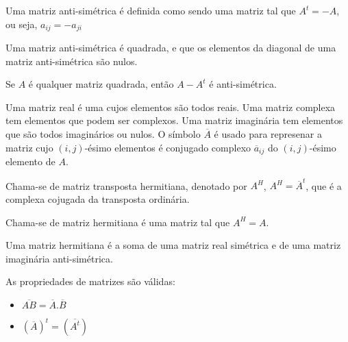 \documentclass[10pt,a4paper]{article}
\begin{document}
\begin{definition}
Uma matriz anti-simétrica é definida como sendo uma matriz tal que $A^t = -A$, ou seja, $a_{ij} = -a_{ji}$
\end{definition}

\begin{lemma}
Uma matriz anti-simétrica é quadrada, e que os elementos da diagonal de uma matriz anti-simétrica são nulos.
\end{lemma}

\begin{lemma}
Se $A$ é qualquer matriz quadrada, então $A-A^t$ é anti-simétrica.
\end{lemma}

\begin{definition}
Uma matriz real é uma cujos elementos são todos reais. Uma matriz complexa tem elementos que podem ser complexos. Uma matriz imaginária tem elementos que são todos imaginários ou nulos. O símbolo $\overline{A}$ é usado para represenar a matriz cujo $(i, j)$-ésimo elementos é conjugado complexo $\overline{a}_{ij}$ do $(i, j)$-ésimo elemento de $A$. 
\end{definition}

\begin{definition}
Chama-se de matriz transposta hermitiana, denotado por $A^H$, $A^H = \overline{A}^t$, que é a complexa cojugada da transposta ordinária.
\end{definition}

\begin{definition}
Chama-se de matriz hermitiana é uma matriz tal que $A^H = A$.
\end{definition}

\begin{lemma}
Uma matriz hermitiana é a soma de uma matriz real simétrica e de uma matriz imaginária anti-simétrica.
\end{lemma}

\begin{lemma}
As propriedades de matrizes são válidas:
	\begin{itemize}
		\item $\overline{AB} = \overline{A}.\overline{B}$
		\item $(\overline{A})^t = (\overline{A^t})$
	\end{itemize}
\end{lemma}
\end{document}

